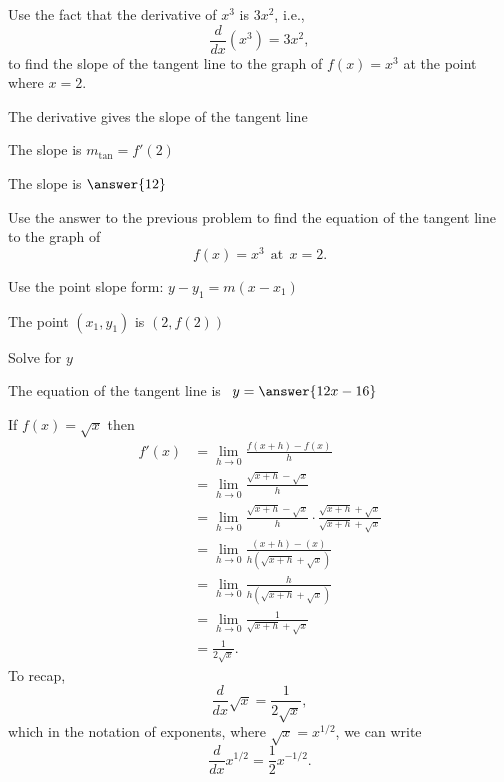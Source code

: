 \documentclass{ximera}
\begin{document}
\begin{problem} %
Use the fact that the derivative of $x^3$ is $3x^2$,
i.e., 
\[
\frac{d}{dx}\left( x^3 \right) = 3x^2,
\]
to find the slope of the tangent line to the graph of 
$f(x) = x^3$ at the point where $x = 2$.\\
\begin{hint}
The derivative gives the slope of the tangent line
\end{hint}
\begin{hint}
The slope is $m_{\text{tan}} = f'(2)$
\end{hint}
The slope is $\answer{12}$
\end{problem}




\begin{problem} %
Use the answer to the previous problem to find the equation of the tangent line to the graph of 
\[
f(x) = x^3 \ \ \text{at} \ \ x=2.
\]
\begin{hint}
Use the point slope form: $y-y_1 = m(x-x_1)$
\end{hint}
\begin{hint}
The point $(x_1,y_1)$ is $(2, f(2))$
\end{hint}
\begin{hint}
Solve for $y$
\end{hint}
The equation of the tangent line is \ $y = \answer{12x-16}$
\end{problem}




\begin{example}[example 4]
If $f(x) = \sqrt x$ then
\begin{align*}
f'(x) &= \lim_{h \to 0} \frac{f(x+h)-f(x)}{h}\\[5pt]
&= \lim_{h \to 0} \frac{\sqrt{x+h}- \sqrt x}{h}\\[5pt]
&= \lim_{h \to 0} \frac{\sqrt{x+h}- \sqrt x}{h} \cdot \frac{\sqrt{x+h}+ \sqrt x}{\sqrt{x+h}+ \sqrt x} \\[5pt]
&= \lim_{h \to 0} \frac{(x+h) - (x)}{h(\sqrt{x+h}+ \sqrt x)}\\[5pt]
&= \lim_{h \to 0} \frac{h}{h(\sqrt{x+h}+ \sqrt x)}\\[5pt]
&= \lim_{h \to 0} \frac{1}{\sqrt{x+h}+ \sqrt x}\\[5pt]
&=  \frac{1}{2 \sqrt x}.
\end{align*}
To recap, 
\[
\frac{d}{dx}\sqrt{x} = \frac{1}{2\sqrt{x}},
\]
which in the notation of exponents, where $\sqrt x = x^{1/2}$, we can write
\[
\frac{d}{dx}x^{1/2} = \frac12 x^{-1/2}.
\]

\end{example}
\end{document}
